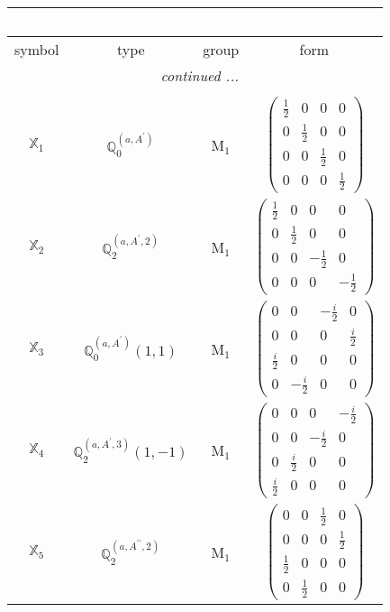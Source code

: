 \documentclass[fleqn,10pt,landscape]{article}
\begin{document}
\begin{itemize}
\begin{center}
\begin{longtable}{c|c|c|c}
\multicolumn{3}{l}{\tablename\ \thetable{}} \\
 \hline \hline
symbol & type & group & form \\ \hline \endhead

 \hline \hline
\multicolumn{3}{r}{\footnotesize\it continued ...} \\ \endfoot

 \hline \hline
\multicolumn{3}{r}{} \\ \endlastfoot

$ \mathbb{X}_{1} $ & $\mathbb{Q}_{0}^{(a,A^{\prime})}$ & M$_{1}$ & $\begin{pmatrix} \frac{1}{2} & 0 & 0 & 0 \\ 0 & \frac{1}{2} & 0 & 0 \\ 0 & 0 & \frac{1}{2} & 0 \\ 0 & 0 & 0 & \frac{1}{2} \end{pmatrix}$ \\
$ \mathbb{X}_{2} $ & $\mathbb{Q}_{2}^{(a,A^{\prime},2)}$ & M$_{1}$ & $\begin{pmatrix} \frac{1}{2} & 0 & 0 & 0 \\ 0 & \frac{1}{2} & 0 & 0 \\ 0 & 0 & - \frac{1}{2} & 0 \\ 0 & 0 & 0 & - \frac{1}{2} \end{pmatrix}$ \\
$ \mathbb{X}_{3} $ & $\mathbb{Q}_{0}^{(a,A^{\prime})}(1,1)$ & M$_{1}$ & $\begin{pmatrix} 0 & 0 & - \frac{i}{2} & 0 \\ 0 & 0 & 0 & \frac{i}{2} \\ \frac{i}{2} & 0 & 0 & 0 \\ 0 & - \frac{i}{2} & 0 & 0 \end{pmatrix}$ \\
$ \mathbb{X}_{4} $ & $\mathbb{Q}_{2}^{(a,A^{\prime},3)}(1,-1)$ & M$_{1}$ & $\begin{pmatrix} 0 & 0 & 0 & - \frac{i}{2} \\ 0 & 0 & - \frac{i}{2} & 0 \\ 0 & \frac{i}{2} & 0 & 0 \\ \frac{i}{2} & 0 & 0 & 0 \end{pmatrix}$ \\
$ \mathbb{X}_{5} $ & $\mathbb{Q}_{2}^{(a,A^{\prime\prime},2)}$ & M$_{1}$ & $\begin{pmatrix} 0 & 0 & \frac{1}{2} & 0 \\ 0 & 0 & 0 & \frac{1}{2} \\ \frac{1}{2} & 0 & 0 & 0 \\ 0 & \frac{1}{2} & 0 & 0 \end{pmatrix}$ \\

\end{longtable}
\end{center}
\end{itemize}
\end{document}
